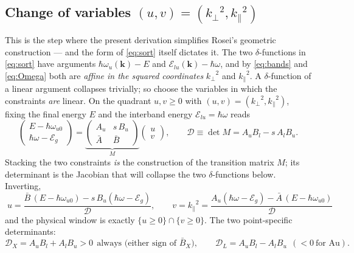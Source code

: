 \documentclass[11pt,a4paper]{article}
\numberwithin{equation}{section}
\begin{document}
\subsection{Change of variables $(u,v)=({k_{\perp}}^2,{k_{\parallel}}^2)$}\label{sec:linear}

This is the step where the present derivation simplifies Rosei's
geometric construction --- and the form of \eqref{eq:sort} itself
dictates it.  The two $\delta$-functions in \eqref{eq:sort} have
arguments $\hbar\omega_u(\mathbf k)-E$ and ${\mathcal{E}_{lu}}(\mathbf k)-{\hbar\omega}$, and
by \eqref{eq:bands} and \eqref{eq:Omega} both are \emph{affine in the
squared coordinates} ${k_{\perp}}^2$ and ${k_{\parallel}}^2$.  A $\delta$-function of
a linear argument collapses trivially; so choose the variables in
which the constraints \emph{are} linear.  On the quadrant $u,v\ge0$
with $(u,v)=({k_{\perp}}^2,{k_{\parallel}}^2)$, fixing the final energy $E$ and the
interband energy ${\mathcal{E}_{lu}}={\hbar\omega}$ reads
\begin{equation}
\begin{pmatrix} E-{\hbar\omega_{u0}}\\[2pt] {\hbar\omega}-{\mathcal{E}_g}\end{pmatrix}
=\underbrace{\begin{pmatrix} A_u & s\,B_u\\[2pt] {\bar{A}} & {\bar{B}}\end{pmatrix}}_{\textstyle M}
\begin{pmatrix} u\\[2pt] v\end{pmatrix},
\qquad
{\mathcal{D}}\equiv\det M=A_uB_l-s\,A_lB_u .
\label{eq:linsys}
\end{equation}
Stacking the two constraints \emph{is} the construction of the
transition matrix $M$; its determinant is the Jacobian that will
collapse the two $\delta$-functions below.  Inverting,
\begin{equation}
\boxed{\;
u=\frac{{\bar{B}}\,(E-{\hbar\omega_{u0}})-s\,B_u({\hbar\omega}-{\mathcal{E}_g})}{{\mathcal{D}}},
\qquad
v={k_{\parallel}}^{2}=\frac{A_u({\hbar\omega}-{\mathcal{E}_g})-{\bar{A}}\,(E-{\hbar\omega_{u0}})}{{\mathcal{D}}}
\;}
\label{eq:uv}
\end{equation}
and the physical window is exactly $\{u\ge0\}\cap\{v\ge0\}$.
The two point-specific determinants:
\begin{equation}
{\mathcal{D}}_X=A_uB_l+A_lB_u>0\ \ \text{always (either sign of ${\bar{B}}_X$)},
\qquad
{\mathcal{D}}_L=A_uB_l-A_lB_u\ \ (<0\ \text{for Au}) .
\label{eq:Ds}
\end{equation}
\end{document}
